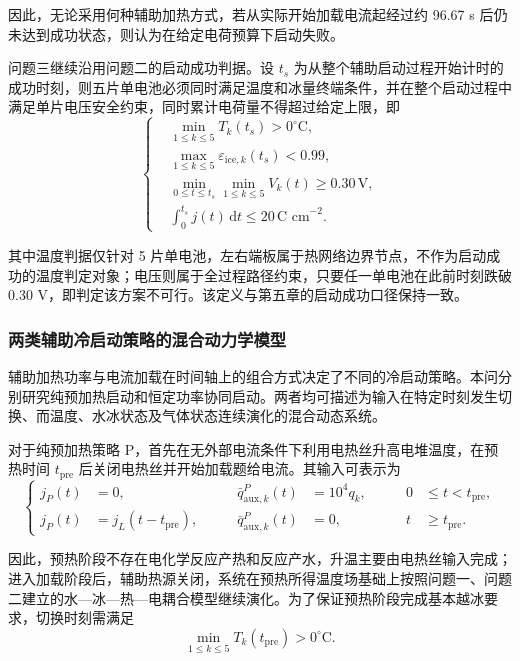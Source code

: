 \documentclass[bwprint]{gmcmthesis}
\numberwithin{figure}{section}
\begin{document}
\noindent 因此，无论采用何种辅助加热方式，若从实际开始加载电流起经过约 96.67 s 后仍未达到成功状态，则认为在给定电荷预算下启动失败。

\noindent 问题三继续沿用问题二的启动成功判据。设 \(t_s\) 为从整个辅助启动过程开始计时的成功时刻，则五片单电池必须同时满足温度和冰量终端条件，并在整个启动过程中满足单片电压安全约束，同时累计电荷量不得超过给定上限，即
\begin{equation}
\left\{
\begin{aligned}
& \min_{1 \leq k \leq 5} T_k(t_s) > 0^\circ\text{C}, \\
& \max_{1 \leq k \leq 5} \varepsilon_{\text{ice},k}(t_s) < 0.99, \\
& \min_{0 \leq t \leq t_s} \min_{1 \leq k \leq 5} V_k(t) \geq 0.30 \, \text{V}, \\
& \int_0^{t_s} j(t) \, \text{d}t \leq 20 \, \text{C cm}^{-2}.
\end{aligned}
\right.
\tag{6-19}
\end{equation}

\noindent 其中温度判据仅针对 5 片单电池，左右端板属于热网络边界节点，不作为启动成功的温度判定对象；电压则属于全过程路径约束，只要任一单电池在此前时刻跌破 0.30 V，即判定该方案不可行。该定义与第五章的启动成功口径保持一致。

\subsubsection{两类辅助冷启动策略的混合动力学模型}

\noindent 辅助加热功率与电流加载在时间轴上的组合方式决定了不同的冷启动策略。本问分别研究纯预加热启动和恒定功率协同启动。两者均可描述为输入在特定时刻发生切换、而温度、水冰状态及气体状态连续演化的混合动态系统。

\noindent 对于纯预加热策略 P，首先在无外部电流条件下利用电热丝升高电堆温度，在预热时间 \(t_{\text{pre}}\) 后关闭电热丝并开始加载题给电流。其输入可表示为
\begin{equation}
\left\{
\begin{aligned}
j_P(t) &= 0, \qquad & \bar{q}_{\text{aux},k}^P(t) &= 10^4 q_k, \qquad & 0 &\leq t < t_{\text{pre}}, \\
j_P(t) &= j_L(t - t_{\text{pre}}), \qquad & \bar{q}_{\text{aux},k}^P(t) &= 0, \qquad & t &\geq t_{\text{pre}}.
\end{aligned}
\right.
\tag{6-20}
\end{equation}

\noindent 因此，预热阶段不存在电化学反应产热和反应产水，升温主要由电热丝输入完成；进入加载阶段后，辅助热源关闭，系统在预热所得温度场基础上按照问题一、问题二建立的水—冰—热—电耦合模型继续演化。为了保证预热阶段完成基本越冰要求，切换时刻需满足
\begin{equation}
\min_{1 \leq k \leq 5} T_k(t_{\text{pre}}) > 0^\circ\text{C}. \tag{6-21}
\end{equation}
\end{document}
